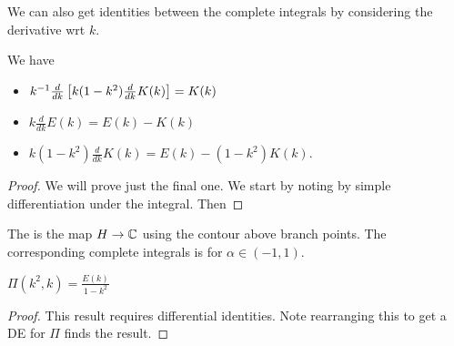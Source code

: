 \documentclass{article}
\begin{document}
We can also get identities between the complete integrals by considering the derivative wrt $k$.

\begin{prop}
	We have 
	\begin{itemize}
		\item $k^{-1}\frac{d}{dk} \left[ k(1-k^2)\frac{d}{dk}K(k) \right]=K(k)$
		\item $k\frac{d}{dk}E(k) = E(k)-K(k)$
		\item $k(1-k^2)\frac{d}{dk} K(k) = E(k) -(1-k^2)K(k)$.
	\end{itemize}
\end{prop}
\begin{proof}
	We will prove just the final one. We start by noting 
	by simple differentiation under the integral. Then 
\end{proof}

\begin{definition}
	The  is the map $H \to \mathbb{C}$ 
	using the contour above branch points. The corresponding complete integrals is 
	for $\alpha \in (-1,1)$. 
\end{definition}

\begin{prop}
	$\Pi(k^2,k) = \frac{E(k)}{1-k^2}$
\end{prop}
\begin{proof}
	This result requires differential identities. Note 
	rearranging this to get a DE for $\Pi$ finds the result. 
\end{proof}
\end{document}
